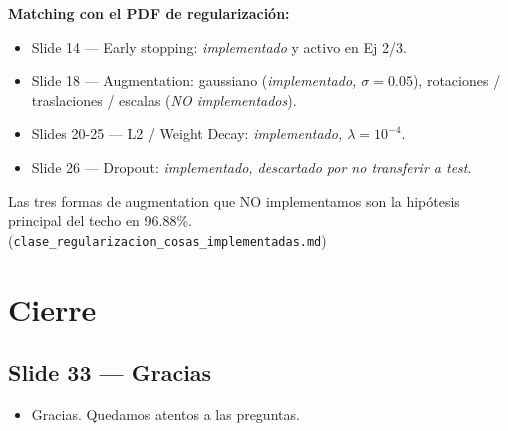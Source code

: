 \documentclass[11pt,a4paper]{article}
\newcommand{\nref}[1]{\textcolor{muted}{\small(\texttt{#1})}}
\begin{document}
\begin{nota}
\textbf{Matching con el PDF de regularización:}
\begin{itemize}[leftmargin=*,topsep=2pt]
  \item Slide 14 — Early stopping: \emph{implementado} y activo en Ej 2/3.
  \item Slide 18 — Augmentation: gaussiano (\emph{implementado, $\sigma=0.05$}),
        rotaciones / traslaciones / escalas (\emph{NO implementados}).
  \item Slides 20-25 — L2 / Weight Decay: \emph{implementado, $\lambda = 10^{-4}$}.
  \item Slide 26 — Dropout: \emph{implementado, descartado por no transferir a test}.
\end{itemize}
Las tres formas de augmentation que NO implementamos son la hipótesis
principal del techo en 96.88\%.
\nref{clase\_regularizacion\_cosas\_implementadas.md}
\end{nota}

\section{Cierre}

\subsection{Slide 33 — Gracias}

\begin{decir}
\begin{itemize}[leftmargin=*,topsep=0pt]
  \item Gracias. Quedamos atentos a las preguntas.
\end{itemize}
\end{decir}
\end{document}
